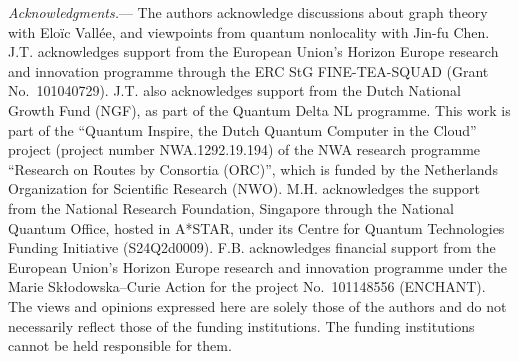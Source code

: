 \documentclass[10pt,aps,pra,twocolumn,floatfix,nofootinbib,superscriptaddress,longbibliography]{revtex4-2}
\begin{document}
	\emph{Acknowledgments.}---
	The authors acknowledge discussions about graph theory with Eloïc Vallée, and viewpoints from quantum nonlocality with Jin-fu Chen.  J.T. acknowledges support from the European Union's Horizon Europe research and innovation programme through the ERC StG FINE-TEA-SQUAD (Grant No.~101040729).
	J.T. also acknowledges support from the Dutch National Growth Fund (NGF), as part of the Quantum Delta NL programme.
	This work is part of the ``Quantum Inspire, the Dutch Quantum Computer in the Cloud'' project (project number NWA.1292.19.194) of the NWA research programme ``Research on Routes by Consortia (ORC)'', which is funded by the Netherlands Organization for Scientific Research (NWO). M.H. acknowledges the support from the National
	Research Foundation, Singapore through the National
	Quantum Office, hosted in A*STAR, under its Centre for
	Quantum Technologies Funding Initiative (S24Q2d0009). F.B. acknowledges financial support from the European Union's Horizon Europe research and innovation programme under the Marie Sk{\l}odowska--Curie Action for the project No.~101148556 (ENCHANT).
	The views and opinions expressed here are solely those of the authors and do not necessarily reflect those of the funding institutions.
	The funding institutions cannot be held responsible for them.
	
\end{document}
